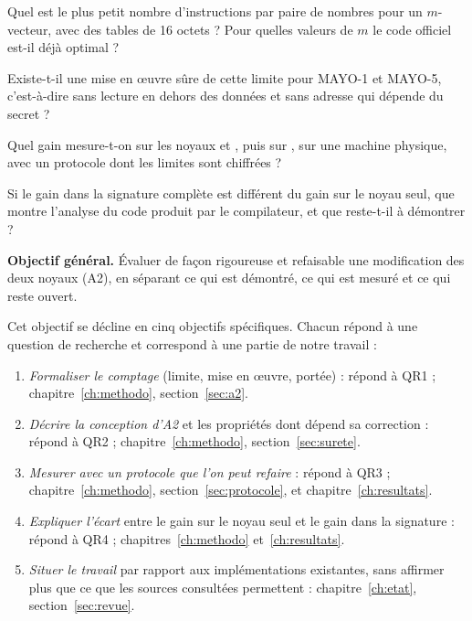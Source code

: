 \begin{description}[leftmargin=2.2cm,labelwidth=2cm]
\item[QR1] Quel est le plus petit nombre d'instructions \vpshufb{} par paire de nombres pour un $m$-vecteur, avec des tables de 16 octets ? Pour quelles valeurs de $m$ le code officiel est-il déjà optimal ?
\item[QR2] Existe-t-il une mise en œuvre sûre de cette limite pour MAYO-1 et MAYO-5, c'est-à-dire sans lecture en dehors des données et sans adresse qui dépende du secret ?
\item[QR3] Quel gain mesure-t-on sur les noyaux  et , puis sur , sur une machine physique, avec un protocole dont les limites sont chiffrées ?
\item[QR4] Si le gain dans la signature complète est différent du gain sur le noyau seul, que montre l'analyse du code produit par le compilateur, et que reste-t-il à démontrer ?
\end{description}

\textbf{Objectif général.} Évaluer de façon rigoureuse et refaisable une modification des deux noyaux (A2), en séparant ce qui est démontré, ce qui est mesuré et ce qui reste ouvert.

Cet objectif se décline en cinq objectifs spécifiques. Chacun répond à une question de recherche et correspond à une partie de notre travail :
\begin{enumerate}[itemsep=1pt,label=\textbf{O\arabic*}]
\item \emph{Formaliser le comptage} (limite, mise en œuvre, portée) : répond à QR1 ; chapitre~\ref{ch:methodo}, section~\ref{sec:a2}.
\item \emph{Décrire la conception d'A2} et les propriétés dont dépend sa correction : répond à QR2 ; chapitre~\ref{ch:methodo}, section~\ref{sec:surete}.
\item \emph{Mesurer avec un protocole que l'on peut refaire} : répond à QR3 ; chapitre~\ref{ch:methodo}, section~\ref{sec:protocole}, et chapitre~\ref{ch:resultats}.
\item \emph{Expliquer l'écart} entre le gain sur le noyau seul et le gain dans la signature : répond à QR4 ; chapitres~\ref{ch:methodo} et~\ref{ch:resultats}.
\item \emph{Situer le travail} par rapport aux implémentations existantes, sans affirmer plus que ce que les sources consultées permettent : chapitre~\ref{ch:etat}, section~\ref{sec:revue}.
\end{enumerate}

